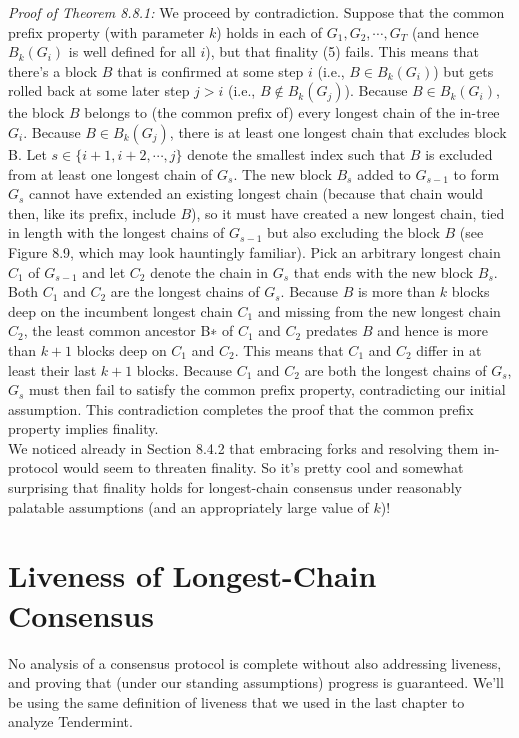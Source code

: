 \textit{Proof of Theorem 8.8.1:} We proceed by contradiction. Suppose that the common prefix
property (with parameter $k$) holds in each of $G_1, G_2, \cdots, G_T$ (and hence $B_k(G_i)$ is well
defined for all $i$), but that finality (5) fails. This means that there’s a block $B$ that is
confirmed at some step $i$ (i.e., $B \in B_k(G_i)$) but gets rolled back at some later step $j > i$
(i.e., $B \notin B_k(G_j)$).
Because $B \in B_k(G_i)$, the block $B$ belongs to (the common prefix of) every longest chain
of the in-tree $G_i$. Because $B \in B_k(G_j)$, there is at least one longest chain that excludes 
block B. Let $s \in \{i+1, i+2, \cdots , j\}$ denote the smallest index such that $B$ is excluded from
at least one longest chain of $G_s$. The new block $B_s$ added to $G_{s-1}$ to form $G_s$ cannot have
extended an existing longest chain (because that chain would then, like its prefix, include $B$),
so it must have created a new longest chain, tied in length with the longest chains of $G_{s-1}$
but also excluding the block $B$ (see Figure 8.9, which may look hauntingly familiar).
Pick an arbitrary longest chain $C_1$ of $G_{s-1}$ and let $C_2$ denote the chain in $G_s$ that ends
with the new block $B_s$. Both $C_1$ and $C_2$ are the longest chains of $G_s$. Because $B$ is more than $k$
blocks deep on the incumbent longest chain $C_1$ and missing from the new longest chain $C_2$,
the least common ancestor B∗ of $C_1$ and $C_2$ predates $B$ and hence is more than $k + 1$ blocks
deep on $C_1$ and $C_2$. This means that $C_1$ and $C_2$ differ in at least their last $k + 1$ blocks.
Because $C_1$ and $C_2$ are both the longest chains of $G_s$, $G_s$ must then fail to satisfy the common
prefix property, contradicting our initial assumption. This contradiction completes the proof
that the common prefix property implies finality.\\

We noticed already in Section 8.4.2 that embracing forks and resolving them in-protocol
would seem to threaten finality. So it’s pretty cool and somewhat surprising that finality
holds for longest-chain consensus under reasonably palatable assumptions (and an appropriately large value of $k$)!


\section{Liveness of Longest-Chain Consensus}

No analysis of a consensus protocol is complete without also addressing liveness, and proving
that (under our standing assumptions) progress is guaranteed. We’ll be using the same
definition of liveness that we used in the last chapter to analyze Tendermint.

